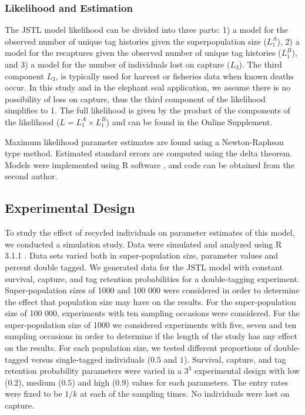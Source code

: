 \documentclass[]{article}
\begin{document}
\subsubsection{Likelihood and
Estimation}\label{likelihood-and-estimation}

The JSTL model likelihood can be divided into three parts: 1) a model for the observed number of unique tag histories given the superpopulation size ($L_1^A$), 2) a model for the recaptures given the observed number of unique tag histories ($L_1^B$), and 3) a model for the number of individuals lost on capture ($L_3$).  The third component $L_3$, is typically used for harvest or fisheries data when known deaths occur.  In this study and in the elephant seal application, we assume there is no possibility of loss on capture, thus the third component of the likelihood simplifies to 1. The
full likelihood is given by the product of the components of the
likelihood (\(L=L_1^A \times L_1^B\)) and can be found in the Online Supplement.

Maximum likelihood parameter estimates are found using a Newton-Raphson type
method. Estimated standard errors are computed using the delta theorem.
Models were implemented using R software \citep{R}, and code can be obtained from the second author.

\subsection{Experimental Design}\label{experimental-design}

To study the effect of recycled individuals on parameter estimates of
this model, we conducted a simulation study. Data were simulated and
analyzed using R 3.1.1 \citep{R}. Data sets varied both in super-population size,
parameter values and percent double tagged. We generated data for the
JSTL model with constant survival, capture, and tag retention
probabilities for a double-tagging experiment. Super-population sizes of
1000 and 100 000 were considered in order to determine the effect that
population size may have on the results. For the super-population size
of 100 000, experiments with ten sampling occasions were considered. For
the super-population size of 1000 we considered experiments with five,
seven and ten sampling occasions in order to determine if the length of
the study has any effect on the results. For each population size, we
tested different proportions of double-tagged versus single-tagged
individuals (\(0.5\) and \(1\)). Survival, capture, and tag retention
probability parameters were varied in a \(3^3\) experimental design with
low (\(0.2\)), medium (\(0.5\)) and high (\(0.9\)) values for each
parameters. The entry rates were fixed to be $1/k$ at each of the
sampling times. No individuals were lost on capture.
\end{document}
